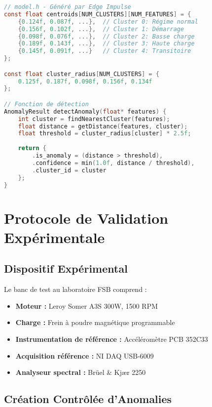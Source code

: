 \begin{lstlisting}[language=C, caption=Intégration du modèle K-means]
// model.h - Généré par Edge Impulse
const float centroids[NUM_CLUSTERS][NUM_FEATURES] = {
    {0.124f, 0.087f, ...},  // Cluster 0: Régime normal
    {0.156f, 0.102f, ...},  // Cluster 1: Démarrage
    {0.098f, 0.076f, ...},  // Cluster 2: Basse charge
    {0.189f, 0.143f, ...},  // Cluster 3: Haute charge
    {0.145f, 0.091f, ...}   // Cluster 4: Transitoire
};

const float cluster_radius[NUM_CLUSTERS] = {
    0.125f, 0.187f, 0.098f, 0.156f, 0.134f
};

// Fonction de détection
AnomalyResult detectAnomaly(float* features) {
    int cluster = findNearestCluster(features);
    float distance = getDistance(features, cluster);
    float threshold = cluster_radius[cluster] * 2.5f;
    
    return {
        .is_anomaly = (distance > threshold),
        .confidence = min(1.0f, distance / threshold),
        .cluster_id = cluster
    };
}
\end{lstlisting}

\section{Protocole de Validation Expérimentale}

\subsection{Dispositif Expérimental}

Le banc de test au laboratoire FSB comprend :

\begin{itemize}
    \item \textbf{Moteur :} Leroy Somer A3S 300W, 1500 RPM
    \item \textbf{Charge :} Frein à poudre magnétique programmable
    \item \textbf{Instrumentation de référence :} Accéléromètre PCB 352C33
    \item \textbf{Acquisition référence :} NI DAQ USB-6009
    \item \textbf{Analyseur spectral :} Brüel \& Kjær 2250
\end{itemize}

\subsection{Création Contrôlée d'Anomalies}

